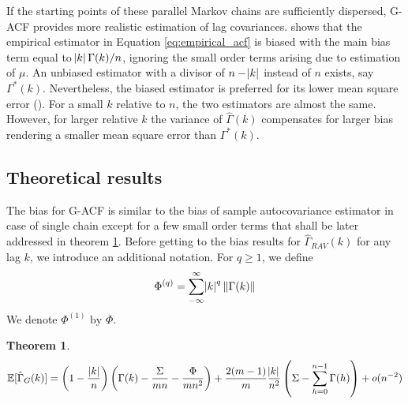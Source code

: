 \documentclass[11pt]{article}
\newtheorem{theorem}{Theorem}
\theoremstyle{remark}
\begin{document}
If the starting points of these parallel Markov chains are sufficiently dispersed, G-ACF provides more realistic estimation of lag covariances. \cite{priestley1981spectral} shows that the empirical estimator in Equation \ref{eq:empirical_acf} is biased with the main bias term equal to $\abs{k}\Gamma(k)/n$, ignoring the small order terms arising due to estimation of $\mu$. An unbiased estimator with a divisor of $n - \abs{k}$ instead of $n$ exists, say $\Gamma^*(k)$. Nevertheless, the biased estimator is preferred for its lower mean square error (\cite{priestley1981spectral}). For a small $k$ relative to $n$, the two estimators are almost the same. However, for larger relative $k$ the variance of $\hat{\Gamma}(k)$ compensates for larger bias rendering a smaller mean square error than $\Gamma^*(k)$. 


\subsection{Theoretical results} %
\label{sub:theoretical_results}


The bias for G-ACF is similar to the bias of sample autocovariance estimator in case of single chain except for a few small order terms that shall be later addressed in theorem \ref{th:G-_expec}. Before getting to the bias results for $\hat{\Gamma}_{RAV}(k)$ for any lag $k$, we introduce an additional notation. For $q \geq 1$, we define
\[
\Phi^{(q)} = \sum\limits_{-\infty}^{\infty}\abs{k}^q \|\Gamma(k)\|
\]
We denote $\Phi^{(1)} \textrm{ by } \Phi$. 
\begin{theorem} \label{th:G-_expec}
   \[
   \mathbb{E}[\hat{\Gamma}_{G}(k)] = \left(1- \dfrac{|k|}{n}\right)\left(\Gamma(k) - \dfrac{\Sigma}{mn} - \dfrac{\Phi}{mn^2}\right)  + \dfrac{2(m-1)}{m}\dfrac{\abs{k}}{n^2} \left(\Sigma - \sum_{h=0}^{n-1}\Gamma(h)\right) + o(n^{-2})
   \]
\end{theorem}
\end{document}
